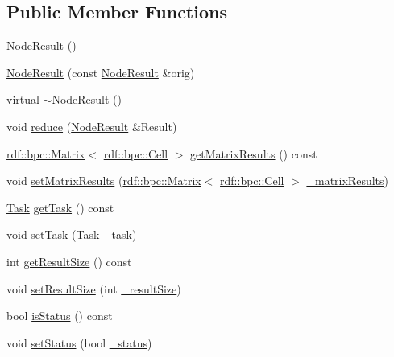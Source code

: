 \subsection*{Public Member Functions}
\begin{DoxyCompactItemize}
\item 
\hyperlink{classrdf_1_1NodeResult_ad99a2ab94c710870e623b26a0d735e0c}{Node\+Result} ()
\item 
\hyperlink{classrdf_1_1NodeResult_a4e9bf903b9fc91b519295cf2adee5620}{Node\+Result} (const \hyperlink{classrdf_1_1NodeResult}{Node\+Result} \&orig)
\item 
virtual \hyperlink{classrdf_1_1NodeResult_a949a946b522bb18514b9028ada1c7ed7}{$\sim$\+Node\+Result} ()
\item 
void \hyperlink{classrdf_1_1NodeResult_ac27761fd1c69163c5c9227c0d7fecf92}{reduce} (\hyperlink{classrdf_1_1NodeResult}{Node\+Result} \&Result)
\item 
\hyperlink{classrdf_1_1bpc_1_1Matrix}{rdf\+::bpc\+::\+Matrix}$<$ \hyperlink{classrdf_1_1bpc_1_1Cell}{rdf\+::bpc\+::\+Cell} $>$ \hyperlink{classrdf_1_1NodeResult_ab0d07def4def30c0875602c5e3dde208}{get\+Matrix\+Results} () const 
\item 
void \hyperlink{classrdf_1_1NodeResult_a22523db74203c1926eb1a09da19b5f27}{set\+Matrix\+Results} (\hyperlink{classrdf_1_1bpc_1_1Matrix}{rdf\+::bpc\+::\+Matrix}$<$ \hyperlink{classrdf_1_1bpc_1_1Cell}{rdf\+::bpc\+::\+Cell} $>$ \hyperlink{classrdf_1_1NodeResult_a36b193367d64ea8ca0e71cc912091b71}{\+\_\+matrix\+Results})
\item 
\hyperlink{classrdf_1_1Task}{Task} \hyperlink{classrdf_1_1NodeResult_a564d581492a48333ed9796f6fd4b8c6a}{get\+Task} () const 
\item 
void \hyperlink{classrdf_1_1NodeResult_a29f9794788bb251bccddb5377bb78eba}{set\+Task} (\hyperlink{classrdf_1_1Task}{Task} \hyperlink{classrdf_1_1NodeResult_aa628e795914de688be784892e147fd2d}{\+\_\+task})
\item 
int \hyperlink{classrdf_1_1NodeResult_a47e07daae11352e753629f2fca98d526}{get\+Result\+Size} () const 
\item 
void \hyperlink{classrdf_1_1NodeResult_a8336897151c993416ecb57e2128665b7}{set\+Result\+Size} (int \hyperlink{classrdf_1_1NodeResult_a81eef6ae8527545bc412f49cd3cda6ed}{\+\_\+result\+Size})
\item 
bool \hyperlink{classrdf_1_1NodeResult_a09ad0a96c0591976f73ef288eff195c7}{is\+Status} () const 
\item 
void \hyperlink{classrdf_1_1NodeResult_a52df0a39fb56beec66feacf802639b2c}{set\+Status} (bool \hyperlink{classrdf_1_1NodeResult_a19b142fa64e67d996cb5614450d96c5f}{\+\_\+status})
\end{DoxyCompactItemize}
